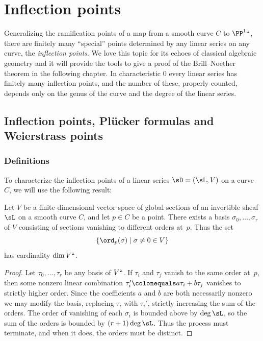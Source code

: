 

\chapter{Inflection points}\label{inflections chapter}
\label{InflectionsChapter}

Generalizing the ramification points of a map from a smooth curve $C$
%
to $\PP^1` `$, there are finitely many ``special'' points determined by
any linear series on any curve, the \emph{inflection points}.
%
We love this topic for its echoes of classical algebraic geometry and
it will provide the tools to give a proof of the Brill--Noether
theorem in the following chapter. In characteristic 0 every linear
series has finitely many inflection points, and the number of these,
properly counted, depends only on the genus of the curve and the
degree of the linear series.

\section{Inflection points,  Pl\"ucker formulas and Weierstrass points}

\subsection*{Definitions}
To characterize the inflection points of a linear series 
$\sD = (\sL, V)$ on a curve $C$, we will use the following result:

\begin{proposition}\label{vanishing sequence} Let $V$ be a
%
  finite-dimensional vector space of 
global sections
%
of an 
invertible sheaf
%
$\sL$ on a smooth curve $C$, and let $p \in C$
be a point. There exists a basis $\sigma_0, \dots, \sigma_r$ of $V$
consisting of sections vanishing to different orders at~$p$. Thus the set 
$$
\{ \ord_p(\sigma) \mid \sigma \neq 0 \in V \}
$$
 has cardinality $\dim V` `$.
\unif
\end{proposition}

\begin{proof} 
Let $\tau_0, \dots, \tau_r$ be any basis of $V` `$.  If  $\tau_i$ and
$\tau_j$ vanish to the same order at~$p$, then
some nonzero linear combination $\tau_i' \colonequals  a\tau_i+b\tau_j$
vanishes to strictly higher order. Since the coefficients $a$ and $b$
are both necessarily nonzero we may modify the basis, replacing $\tau_i$
with $\tau_i'$, strictly increasing the sum of the orders.
The order of vanishing of each $\sigma_i$ is bounded above by $\deg \sL$,
so the sum of the orders is bounded by $(r+1)\deg \sL$. Thus the process
must terminate, and when it does,
 the orders must be distinct.
\end{proof}

